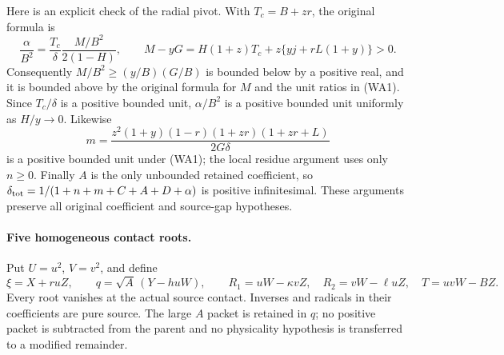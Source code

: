 Here is an explicit check of the radial pivot. With $T_c=B+zr$,
the original formula is
\[
 \frac\alpha{B^2}
   =\frac{T_c}{\delta}\frac{M/B^2}{2(1-H)},\qquad
 M-yG=H(1+z)T_c+z\{yj+rL(1+y)\}>0.                  \tag{WA2}
\]
Consequently $M/B^2\ge(y/B)(G/B)$ is bounded below by a
positive real, and it is bounded above by the original formula
for $M$ and the unit ratios in (WA1). Since $T_c/\delta$ is a
positive bounded unit, $\alpha/B^2$ is a positive bounded unit
uniformly as $H/y\to0$. Likewise
\[
 m=\frac{z^2(1+y)(1-r)(1+zr)(1+zr+L)}{2G\delta}
\]
is a positive bounded unit under (WA1); the local residue argument
uses only $n\ge0$. Finally $A$ is the only unbounded retained coefficient, so
$\delta_{\rm tot}=1/(1+n+m+C+A+D+\alpha)$ is positive
infinitesimal. These arguments preserve all original coefficient
and source-gap hypotheses.

\paragraph{Five homogeneous contact roots.}
Put $U=u^2$, $V=v^2$, and define
\[
 \xi=X+ruZ,\qquad q=\sqrt A\,(Y-huW),\qquad
 R_1=uW-\kappa vZ,\quad R_2=vW-\ell uZ,\quad
 T=uvW-BZ.                                             \tag{WA3}
\]
Every root vanishes at the actual source contact. Inverses and
radicals in their coefficients are pure source. The large $A$
packet is retained in $q$; no positive packet is subtracted from
the parent and no physicality hypothesis is transferred to a
modified remainder.

